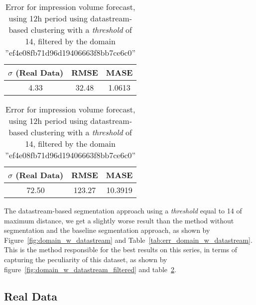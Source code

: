 \begin{table}[!ht]
\centering
\footnotesize
\begin{minipage}[t]{0.45\linewidth}
\centering
\footnotesize
\begin{tabular}{ccc}
 $\sigma$ (Real Data) & RMSE & MASE   \\ \hline
4.33 & 32.48 & 1.0613 \\
\end{tabular}

\vspace{0.5cm}

\caption[Error Volume
impression forecast, datastream, filtered]{Error for impression volume
forecast, using 12h period using datastream-based clustering with a
\emph{threshold} of 14}
\label{tab:err_domain_w_datastream}


\end{minipage}
\quad
\begin{minipage}[t]{0.45\linewidth}
\centering
\footnotesize
\begin{tabular}{ccc}
 $\sigma$ (Real Data) & RMSE & MASE   \\ \hline
72.50 & 123.27 & 10.3919 \\
\end{tabular}

\vspace{0.5cm}

\caption[Error Volume
impression forecast, domain, filtered]{Error for impression volume
forecast, using 12h period using datastream-based clustering with a
\emph{threshold} of 14, filtered by the domain ''ef4e08fb71d96d19406663f8bb7ce6c0'' }
\label{tab:err_domain_w_segmentation_datastream_filtered}


\end{minipage}

\end{table}

The datastream-based segmentation approach using a \emph{threshold} equal to 14 of
maximum distance, we get a slightly worse result than the method without segmentation and
the baseline segmentation approach, as shown by
Figure~\ref{fig:domain_w_datastream} and
Table~\ref{tab:err_domain_w_datastream}. This is the method responsible for the best results on this series,
in terms of capturing the peculiarity of this
dataset, as shown by figure~\ref{fig:domain_w_datastream_filtered} and
table~\ref{tab:err_domain_w_segmentation_datastream_filtered}.

\subsection{Real Data}

